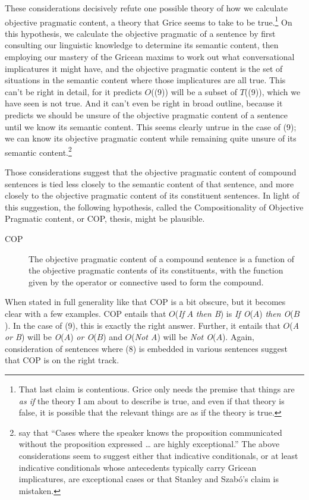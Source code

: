 These considerations decisively refute one possible theory of how we calculate objective pragmatic content, a theory that Grice seems to take to be true.\footnote{That last claim is contentious. Grice only needs the premise that things are \textit{as if }the theory I am about to describe is true, and even if that theory is false, it is possible that the relevant things are as if the theory is true.} On this hypothesis, we calculate the objective pragmatic of a sentence by first consulting our linguistic knowledge to determine its semantic content, then employing our mastery of the Gricean maxims to work out what conversational implicatures it might have, and the objective pragmatic content is the set of situations in the semantic content where those implicatures are all true. This can't be right in detail, for it predicts \(O\)((9)) will be a subset of \(T\)((9)), which we have seen is not true. And it can't even be right in broad outline, because it predicts we should be unsure of the objective pragmatic content of a sentence until we know its semantic content. This seems clearly untrue in the case of (9); we can know its objective pragmatic content while remaining quite unsure of its semantic content.\footnote{\cite[231]{Stanley2000-STAOQD} say that ``Cases where the speaker knows the proposition communicated without the proposition expressed {\dots} are highly exceptional.'' The above considerations seem to suggest either that indicative conditionals, or at least indicative conditionals whose antecedents typically carry Gricean implicatures, are exceptional cases or that Stanley and Szab\'{o}'s claim is mistaken.}

Those considerations suggest that the objective pragmatic content of compound sentences is tied less closely to the semantic content of that sentence, and more closely to the objective pragmatic content of its constituent sentences. In light of this suggestion, the following hypothesis, called the Compositionality of Objective Pragmatic content, or COP, thesis, might be plausible.

\begin{description}
\item[COP] The objective pragmatic content of a compound sentence is a function of the objective pragmatic contents of its constituents, with the function given by the operator or connective used to form the compound.
\end{description}

\noindent When stated in full generality like that COP is a bit obscure, but it becomes clear with a few examples. COP entails that \(O\)(\textit{If} \(A\) \textit{then B}) is \textit{If O}(\(A\))\textit{ then O}(\(B\)). In the case of (9), this is exactly the right answer. Further, it entails that \(O\)(\textit{A or B}) will be\textit{ O}(\(A\))\textit{ or O}(\(B\)) and \(O\)(\textit{Not A}) will be \textit{Not O}(\(A\)). Again, consideration of sentences where (8) is embedded in various sentences suggest that COP is on the right track.

